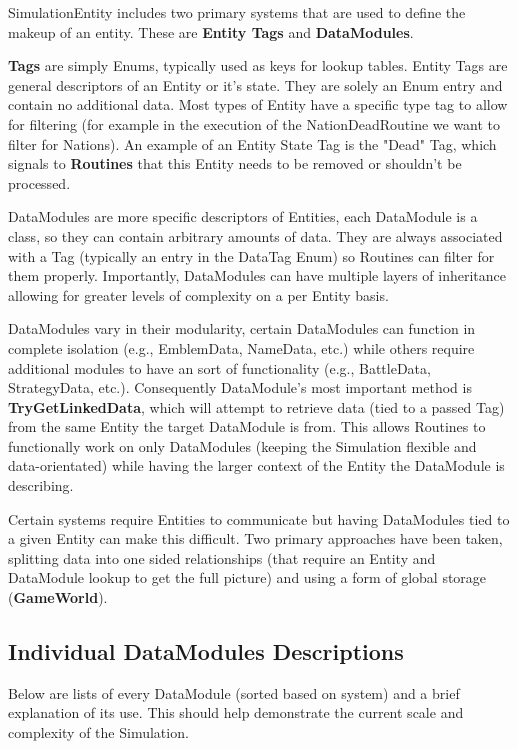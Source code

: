 \documentclass{report}
\begin{document}
SimulationEntity includes two primary systems that are used to define the makeup of an entity. These are \textbf{Entity Tags} and \textbf{DataModules}.

\textbf{Tags} are simply Enums, typically used as keys for lookup tables. Entity Tags are general descriptors of an Entity or it's state. They are solely an Enum entry and contain no additional data.  Most types of Entity have a specific type tag to allow for filtering (for example in the execution of the NationDeadRoutine we want to filter for Nations). An example of an Entity State Tag is the "Dead" Tag, which signals to \textbf{Routines} that this Entity needs to be removed or shouldn't be processed.

DataModules are more specific descriptors of Entities, each DataModule is a class, so they can contain arbitrary amounts of data. They are always associated with a Tag (typically an entry in the DataTag Enum) so Routines can filter for them properly. Importantly, DataModules can have multiple layers of inheritance allowing for greater levels of complexity on a per Entity basis.

DataModules vary in their modularity, certain DataModules can function in complete isolation (e.g., EmblemData, NameData, etc.) while others require additional modules to have an sort of functionality (e.g., BattleData, StrategyData, etc.). Consequently DataModule's most important method is \textbf{TryGetLinkedData}, which will attempt to retrieve data (tied to a passed Tag) from the same Entity the target DataModule is from. This allows Routines to functionally work on only DataModules (keeping the Simulation flexible and data-orientated) while having the larger context of the Entity the DataModule is describing.

Certain systems require Entities to communicate but having DataModules tied to a given Entity can make this difficult. Two primary approaches have been taken, splitting data into one sided relationships (that require an Entity and DataModule lookup to get the full picture) and using a form of global storage (\textbf{GameWorld}).

\subsection{Individual DataModules Descriptions}

Below are lists of every DataModule (sorted based on system) and a brief explanation of its use. This should help demonstrate the current scale and complexity of the Simulation.
\end{document}
